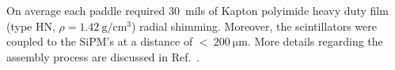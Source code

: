 

On average each paddle required 30~mils of Kapton polyimide heavy duty film (type HN, $\rho = 1.42\ \mathrm{g/cm^{3}}$) radial shimming.  Moreover, the scintillators were coupled to the SiPM's at a distance of $\mathrm{<\ 200\ \mu m}$.  More details regarding the assembly process are discussed in Ref.~\cite{pooser16}.



